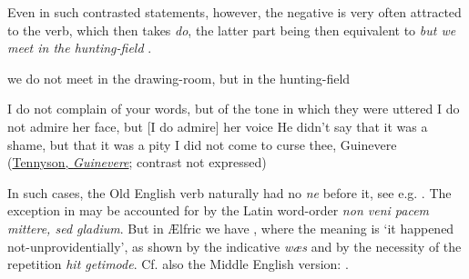 Even in such contrasted statements, however, the negative is very often attracted to the verb, which then takes \textit{do}, the latter part being then equivalent to \textit{but we meet in the hunting-field} .

\ea \label{ex:05-08}
we do not meet in the drawing-room, but in the hunting-field 
\z

\ea \label{ex:05-09}
\ea
I do not complain of your words, but of the tone in which they were uttered
\ex
I do not admire her face, but [I do admire] her voice
\ex
He didn't say that it was a shame, but that it was a pity
\ex
I did not come to curse thee, Guinevere\\\hfill(\href{https://en.wikisource.org/wiki/Idylls_of_the_King/Guinevere}{Tennyson, \textit{Guinevere}}; contrast not expressed)
\z
\z{}

In such cases, the Old English verb naturally had no \textit{ne} before it, see e.g. . The exception in  may be accounted for by the Latin word-order \textit{non veni pacem mittere, sed gladium}. But in Ælfric we have , where the meaning is `it happened not-unprovidentially', as shown by the indicative \textit{wæs} and by the necessity of the repetition \textit{hit getimode}. Cf. also the Middle English version: %
.

